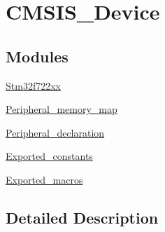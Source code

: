 \hypertarget{group___c_m_s_i_s___device}{}\section{C\+M\+S\+I\+S\+\_\+\+Device}
\label{group___c_m_s_i_s___device}
\subsection*{Modules}
\begin{DoxyCompactItemize}
\item 
\mbox{\hyperlink{group__stm32f722xx}{Stm32f722xx}}
\item 
\mbox{\hyperlink{group___peripheral__memory__map}{Peripheral\+\_\+memory\+\_\+map}}
\item 
\mbox{\hyperlink{group___peripheral__declaration}{Peripheral\+\_\+declaration}}
\item 
\mbox{\hyperlink{group___exported__constants}{Exported\+\_\+constants}}
\item 
\mbox{\hyperlink{group___exported__macros}{Exported\+\_\+macros}}
\end{DoxyCompactItemize}


\subsection{Detailed Description}

